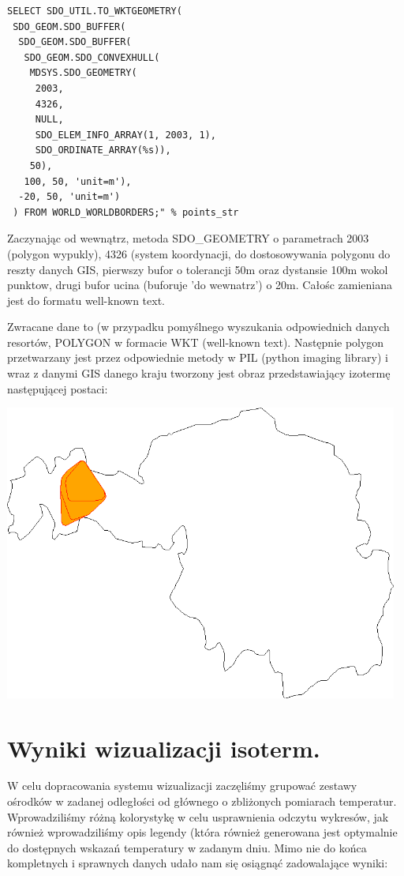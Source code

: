 \documentclass[12pt]{article}
\begin{document}
\begin{verbatim}
SELECT SDO_UTIL.TO_WKTGEOMETRY(
 SDO_GEOM.SDO_BUFFER(
  SDO_GEOM.SDO_BUFFER(
   SDO_GEOM.SDO_CONVEXHULL(
    MDSYS.SDO_GEOMETRY(
     2003,
     4326,
     NULL,
     SDO_ELEM_INFO_ARRAY(1, 2003, 1),
     SDO_ORDINATE_ARRAY(%s)),
    50),
   100, 50, 'unit=m'),
  -20, 50, 'unit=m')
 ) FROM WORLD_WORLDBORDERS;" % points_str
\end{verbatim}

Zaczynając od wewnątrz, metoda SDO\_GEOMETRY o parametrach 2003 (polygon wypukly), 4326 (system koordynacji, do dostosowywania polygonu do reszty danych GIS, pierwszy bufor o tolerancji 50m oraz dystansie 100m wokol punktow, drugi bufor ucina (buforuje 'do wewnatrz') o 20m.  Całośc zamieniana jest do formatu well-known text.

Zwracane dane to (w przypadku pomyślnego wyszukania odpowiednich danych resortów, POLYGON w formacie WKT (well-known text). Następnie polygon przetwarzany jest przez odpowiednie metody w PIL (python imaging library) i wraz z danymi GIS danego kraju tworzony jest obraz przedstawiający izotermę następującej postaci:

\includegraphics[width=35em]{images/isotherm.png}

\section{Wyniki wizualizacji isoterm.}

W celu dopracowania systemu wizualizacji zaczęliśmy grupować zestawy ośrodków w zadanej odległości od głównego o zbliżonych pomiarach temperatur. Wprowadziliśmy różną kolorystykę w celu usprawnienia odczytu wykresów, jak również wprowadziliśmy opis legendy (która również generowana jest optymalnie do dostępnych wskazań temperatury w zadanym dniu. Mimo nie do końca kompletnych i sprawnych danych udało nam się osiągnąć zadowalające wyniki:
\end{document}
